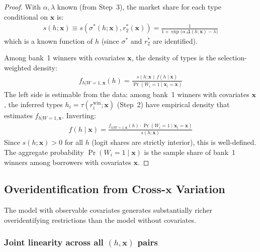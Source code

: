 \documentclass[12pt]{article}
\theoremstyle{plain}
\theoremstyle{plain}
\theoremstyle{definition}  %
\theoremstyle{remark}  %
\begin{document}
\begin{proof}
With $\alpha, \lambda$ known (from Step~3), the market share for each type conditional on $\mathbf{x}$ is:
\begin{align}\label{eq:id_s_known}
    s(h; \mathbf{x}) \equiv s(\sigma^*(h;\mathbf{x}), r_2^*(\mathbf{x})) = \frac{1}{1 + \exp\!\big(\alpha\,\Delta(h;\mathbf{x}) - \lambda\big)}
\end{align}
which is a known function of $h$ (since $\sigma^*$ and $r_2^*$ are identified).

Among bank~1 winners with covariates $\mathbf{x}$, the density of types is the selection-weighted density:
\begin{align}\label{eq:id_f1}
    f_{h|W=1,\mathbf{x}}(h) = \frac{s(h; \mathbf{x})\, f(h \mid \mathbf{x})}{\Pr(W_i = 1 \mid \mathbf{x}_i = \mathbf{x})}
\end{align}
The left side is estimable from the data: among bank~1 winners with covariates $\mathbf{x}$, the inferred types $h_i = \tau(r_i^{\text{win}}; \mathbf{x})$ (Step~2) have empirical density that estimates $f_{h|W=1,\mathbf{x}}$. Inverting:
\begin{align}\label{eq:id_f_recovered}
    f(h \mid \mathbf{x}) = \frac{f_{h|W=1,\mathbf{x}}(h) \cdot \Pr(W_i = 1 \mid \mathbf{x}_i = \mathbf{x})}{s(h; \mathbf{x})}
\end{align}
Since $s(h; \mathbf{x}) > 0$ for all $h$ (logit shares are strictly interior), this is well-defined. The aggregate probability $\Pr(W_i = 1 \mid \mathbf{x})$ is the sample share of bank~1 winners among borrowers with covariates $\mathbf{x}$.
\end{proof}


\subsection{Overidentification from Cross-$\mathbf{x}$ Variation}\label{sec:overid_x}

The model with observable covariates generates substantially richer overidentifying restrictions than the model without covariates.

\subsubsection{Joint linearity across all $(h, \mathbf{x})$ pairs}
\end{document}
